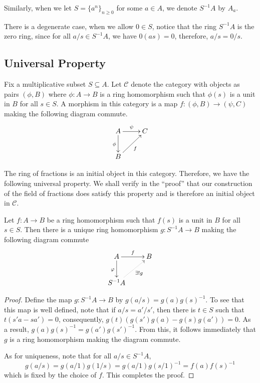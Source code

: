 Similarly, when we let $S = \{a^n\}_{n\ge 0}$ for some $a\in A$, we denote $S^{-1}A$ by $A_a$.

There is a degenerate case, when we allow $0\in S$, notice that the ring $S^{-1}A$ is the zero ring, since for all $a/s\in S^{-1}A$, we have $0(as) = 0$, therefore, $a/s = 0/s$.

\subsection{Universal Property}

Fix a multiplicative subset $S\subseteq A$. Let $\mathscr C$ denote the category with objects as pairs $(\phi, B)$ where $\phi: A\to B$ is a ring homomorphism such that $\phi(s)$ is a unit in $B$ for all $s\in S$. A morphism in this category is a map $f:(\phi, B)\to(\psi, C)$ making the following diagram commute.
\begin{equation*}
\xymatrix{
    A\ar[r]^{\psi}\ar[d]_\phi & C\\
    B\ar[ru]_f
}
\end{equation*}

The ring of fractions is an initial object in this category. Therefore, we have the following universal property. We shall verify in the ``proof'' that our construction of the field of fractions does satisfy this property and is therefore an initial object in $\mathscr C$.

\begin{proposition}
    Let $f: A\to B$ be a ring homomorphism such that $f(s)$ is a unit in $B$ for all $s\in S$. Then there is a unique ring homomorphism $g: S^{-1}A\to B$ making the following diagram commute 
    \begin{equation*}
    \xymatrix{
        A\ar[r]^f\ar[d]_\varphi & B\\
        S^{-1}A\ar@{.>}[ru]_-{\exists!g}
    }
    \end{equation*}
\end{proposition}
\begin{proof}
    Define the map $g: S^{-1}A\to B$ by $g(a/s) = g(a)g(s)^{-1}$. To see that this map is well defined, note that if $a/s = a'/s'$, then there is $t\in S$ such that $t(s'a - sa') = 0$, consequently, $g(t)(g(s')g(a) - g(s)g(a')) = 0$. As a result, $g(a)g(s)^{-1} = g(a')g(s')^{-1}$. From this, it follows immediately that $g$ is a ring homomorphism making the diagram commute.

    As for uniqueness, note that for all $a/s\in S^{-1}A$,
    \begin{equation*}
        g(a/s) = g(a/1)g(1/s) = g(a/1)g(s/1)^{-1} = f(a)f(s)^{-1}
    \end{equation*}
    which is fixed by the choice of $f$. This completes the proof.
\end{proof}


